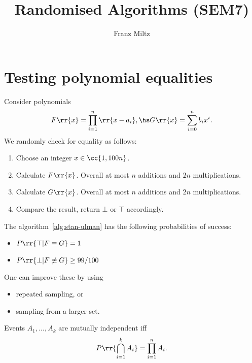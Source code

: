 \documentclass{article}
\title{Randomised Algorithms (SEM7)}
\author{Franz Miltz}
\begin{document}
\maketitle


\section{Testing polynomial equalities}

\begin{algorithm}
  \label{alg:stan-ulam}
  Consider polynomials
  \begin{align*}
    F \rr{ x } = \prod_{i=1}^n \rr{ x - a_i }, \hs G \rr{ x } = \sum_{ i=0 }^{ n } b_i x^i.
  \end{align*}
  We randomly check for equality as follows:
  \begin{enumerate}
    \item Choose an integer $x\in \cc{ 1, 100n }$.
    \item Calculate $F \rr{ x }$. Overall at most $n$ additions and $2n$ multiplications.
    \item Calculate $G \rr{ x }$. Overall at most $n$ additions and $2n$ multiplications.
    \item Compare the result, return $\bot$ or $\top$ accordingly.
  \end{enumerate}
\end{algorithm}


\begin{theorem}
  \label{thm:stan-ulman-probabilities}
  The algorithm~\ref{alg:stan-ulman} has the following probabilities of success:
  \begin{itemize}
    \item $P \rr{ \top | F\equiv G } = 1$
    \item $P \rr{ \bot | F\not\equiv G } \geq 99/100$
  \end{itemize}
  One can improve these by using
  \begin{itemize}
    \item repeated sampling, or
    \item sampling from a larger set.
  \end{itemize}
\end{theorem}


\begin{definition}
  \label{def:independence}
  Events $A_1,...,A_k$ are mutually independent iff
  \begin{align*}
    P \rr{ \bigcap_{i=1}^k A_i } = \prod_{i=1}^n A_i.
  \end{align*}
\end{definition}
\end{document}
